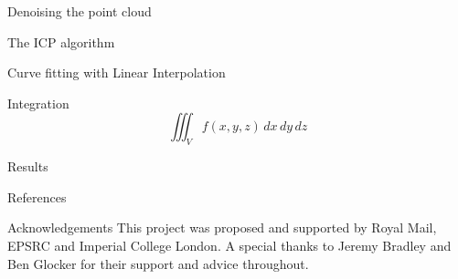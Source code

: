 \documentclass{beamer}
\begin{document}
\begin{frame}{Denoising the point cloud}











\end{frame}


\begin{frame}{The ICP algorithm}











\end{frame}


\begin{frame}{Curve fitting with Linear Interpolation}




\end{frame}



\begin{frame}{Integration}
\begin{equation}
\iiint_V f(x,y,z) \,dx\,dy\,dz 
\end{equation}

\end{frame}


\begin{frame}{Results}

\end{frame}

\begin{frame}{References}



\end{frame}





\begin{frame}{Acknowledgements}
This project was proposed and supported by Royal Mail, EPSRC and Imperial College London. A special thanks to Jeremy Bradley and Ben Glocker for their support and advice throughout.
\end{frame}

\end{document}
